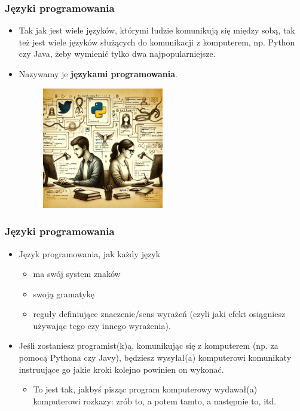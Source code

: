 \documentclass{beamer}
\begin{document}
\begin{frame}[fragile]
\frametitle{Języki programowania}
 \begin{itemize}
\item Tak jak jest wiele języków, którymi ludzie komunikują się między sobą, tak też jest wiele języków służących do komunikacji z komputerem, np. Python czy Java, żeby wymienić tylko dwa najpopularniejsze.
\item Nazywamy je \textbf{językami programowania}. 

                    \begin{figure}[h]
                        \centering
                        \includegraphics[width=0.5\textwidth]{../../img/program_komputerowy3.png}
                    \end{figure}                    
                    \end{itemize}
\end{frame}

\begin{frame}[fragile]
\frametitle{Języki programowania}
\begin{itemize}
\item Język programowania, jak każdy język
	\begin{itemize}
	\item ma swój system znaków
	\item swoją gramatykę
	\item reguły definiujące znaczenie/sens wyrażeń (czyli jaki efekt osiągniesz używając tego czy innego wyrażenia).
	\end{itemize}
\item Jeśli zostaniesz programist(k)ą, komunikując się z komputerem (np. za pomocą Pythona czy Javy), będziesz wysyłał(a) komputerowi komunikaty instruujące go jakie kroki kolejno powinien on wykonać. 
	\begin{itemize}
	\item To jest tak, jakbyś pisząc program komputerowy wydawał(a) komputerowi rozkazy: zrób to, a potem tamto, a następnie to, itd.
	\end{itemize}
\end{itemize}
\end{frame}
\end{document}
